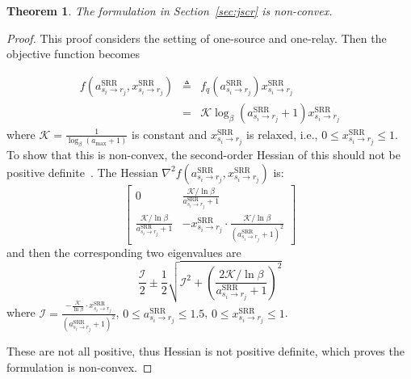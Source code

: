 \documentclass[conference]{IEEEtran}
\begin{document}
\newtheorem{thm}{Theorem}
\begin{thm}
The formulation in Section~\ref{sec:jscr} is non-convex.
\end{thm}
\begin{proof}
This proof considers the setting of one-source and one-relay. Then the objective function becomes

\begin{eqnarray}
f\left(a_{s_{i}\rightarrow r_{j}}^{\text{SRR}}, x_{s_{i}\rightarrow r_{j}}^{\text{SRR}}\right)
&\triangleq&f_{q}\left(a_{s_{i}\rightarrow r_{j}}^{\text{SRR}}\right)x_{s_{i}\rightarrow r_{j}}^{\text{SRR}}\\
&=&\mathcal{K}\log_{\beta}\left(a_{s_{i}\rightarrow r_{j}}^{\text{SRR}}+1\right)x_{s_{i}\rightarrow r_{j}}^{\text{SRR}}
\end{eqnarray}
where $\mathcal{K} = \frac{1}{\log_{\beta}(a_{\text{max}}+1)}$ is constant and $x_{s_{i}\rightarrow r_{j}}^{\text{SRR}}$ is relaxed, i.e., $0\leq x_{s_{i}\rightarrow r_{j}}^{\text{SRR}}\leq 1$.
To show that this is non-convex, the second-order Hessian of this should not be positive definite~\cite{boydbook}.
The Hessian $\nabla^{2}f\left(a_{s_{i}\rightarrow r_{j}}^{\text{SRR}}, x_{s_{i}\rightarrow r_{j}}^{\text{SRR}}\right)$ is:
\begin{equation}
\begin{bmatrix}
0 & \frac{\mathcal{K}/\ln \beta}{a_{s_{i}\rightarrow r_{j}}^{\text{SRR}}+1}\\
\frac{\mathcal{K}/\ln \beta}{a_{s_{i}\rightarrow r_{j}}^{\text{SRR}}+1} & -x_{s_{i}\rightarrow r_{j}}^{\text{SRR}}\cdot\frac{\mathcal{K}/\ln \beta}{\left(a_{s_{i}\rightarrow r_{j}}^{\text{SRR}}+1\right)^{2}}
\end{bmatrix}
\end{equation}
and then the corresponding two eigenvalues are
\begin{equation}
\frac{\mathcal{I}}{2} \pm \frac{1}{2}\sqrt{
		\mathcal{I}^{2} + \left(\frac{2\mathcal{K}/\ln \beta}{a_{s_{i}\rightarrow r_{j}}^{\text{SRR}}+1}\right)^{2}
		}
\end{equation}
where $\mathcal{I}=\frac{-\frac{\mathcal{K}}{\ln \beta}\cdot x_{s_{i}\rightarrow r_{j}}^{\text{SRR}}}{\left(a_{s_{i}\rightarrow r_{j}}^{\text{SRR}}+1\right)^{2}}$, $0\leq a_{s_{i}\rightarrow r_{j}}^{\text{SRR}}\leq 1.5$, $0 \leq x_{s_{i}\rightarrow r_{j}}^{\text{SRR}} \leq 1$.

These are not all positive, thus Hessian is not positive definite, which proves the formulation is non-convex.
\end{proof}
\end{document}
